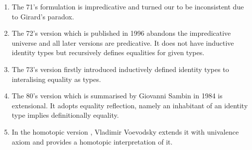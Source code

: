 

\begin{enumerate}

\item The 71's formulation \cite{per:71} is impredicative and turned our to be inconsistent due to Girard's paradox.

\item The 72's version which is published in 1996 \cite{Martin-Lof-1972} abandons the impredicative universe and all later versions are predicative. It does not have inductive identity types but recursively defines equalities for given types.

\item The 73's version \cite{Martin-Lof-1973} firstly introduced inductively defined identity types to interalising equality as types. 

\item The 80's version which is summarised by Giovanni Sambin in 1984 \cite{martin1984intuitionistic} is extensional. It adopts equality reflection, namely an inhabitant of an identity type implies definitionally equality.

\item In the homotopic version \cite{hott}, Vladimir Voevodsky extends it with univalence axiom and provides a homotopic interpretation of it.

\end{enumerate}







